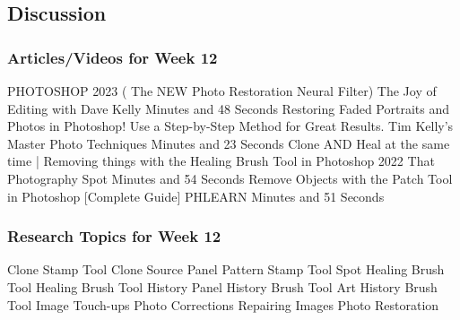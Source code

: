 \documentclass{beamer}
\begin{document}
		\subsection{Discussion}		
			\begin{frame}
				\frametitle{Articles/Videos for Week 12}
				\begin{outline}
					\1 PHOTOSHOP 2023 ( The NEW Photo Restoration Neural Filter)
					\2 The Joy of Editing with Dave Kelly
					 Minutes and 48 Seconds
					\1 Restoring Faded Portraits and Photos in Photoshop! Use a Step-by-Step Method for Great Results.
					\2 Tim Kelly's Master Photo Techniques
					 Minutes and 23 Seconds
					\1 Clone AND Heal at the same time | Removing things with the Healing Brush Tool in Photoshop 2022
					\2 That Photography Spot
					 Minutes and 54 Seconds
					\1 Remove Objects with the Patch Tool in Photoshop [Complete Guide]
					\2 PHLEARN
					 Minutes and 51 Seconds
				\end{outline}
			\end{frame}
		
		\begin{frame}
			\frametitle{Research Topics for Week 12}
			\begin{outline}
				\1 Clone Stamp Tool
				\1 Clone Source Panel
				\1 Pattern Stamp Tool
				\1 Spot Healing Brush Tool
				\1 Healing Brush Tool
				\1 History Panel
				\1 History Brush  Tool
				\1 Art History Brush Tool
				\1 Image Touch-ups
				\1 Photo Corrections
				\1 Repairing Images
				\1 Photo Restoration
			\end{outline}
		\end{frame}
	
			
\end{document}
